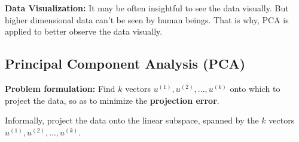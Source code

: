 \vspace{0.5cm}

\noindent \textbf{Data Visualization: } It may be often insightful
to see the data visually. But higher dimensional data can't be
seen by human beings. That is why, PCA is applied to better observe
the data visually.

\subsection*{Principal Component Analysis (PCA)}

\noindent \textbf{Problem formulation: } Find $ k $ vectors 
$ u^{(1)}, u^{(2)}, ... , u^{(k)} $ onto which to project the data, so
as to  minimize the \textbf{projection error}.

\vspace{0.3cm}

\noindent Informally, project the data onto the linear subspace,
spanned by the $ k $ vectors $ u^{(1)}, u^{(2)}, ... , u^{(k)} $.

\vspace{0.5cm}

